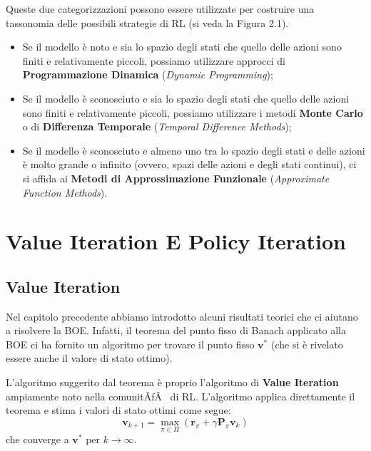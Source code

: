 ﻿\documentclass[11pt, a4paper]{report}
\begin{document}
Queste due categorizzazioni possono essere utilizzate per costruire una tassonomia delle possibili strategie di RL (si veda la Figura 2.1).
\begin{itemize}
    \item Se il modello è noto e sia lo spazio degli stati che quello delle azioni sono finiti e relativamente piccoli, possiamo utilizzare approcci di \textbf{Programmazione Dinamica} (\emph{Dynamic Programming});
\end{itemize}

\newpage

\begin{itemize}
    \item Se il modello è sconosciuto e sia lo spazio degli stati che quello delle azioni sono finiti e relativamente piccoli, possiamo utilizzare i metodi \textbf{Monte Carlo} o di \textbf{Differenza Temporale} (\emph{Temporal Difference Methods});
    \item Se il modello è sconosciuto e almeno uno tra lo spazio degli stati e delle azioni è molto grande o infinito (ovvero, spazi delle azioni e degli stati continui), ci si affida ai \textbf{Metodi di Approssimazione Funzionale} (\emph{Approximate Function Methods}).
\end{itemize}


\newpage

\section{Value Iteration E Policy Iteration}

\subsection{Value Iteration}

Nel capitolo precedente abbiamo introdotto alcuni risultati teorici che ci aiutano a risolvere la BOE. Infatti, il teorema del punto fisso di Banach applicato alla BOE ci ha fornito un algoritmo per trovare il punto fisso $\bm{v}^*$ (che si è rivelato essere anche il valore di stato ottimo).

L'algoritmo suggerito dal teorema è proprio l'algoritmo di \textbf{Value Iteration} ampiamente noto nella comunitÃƒÂ  di RL. L'algoritmo applica direttamente il teorema e stima i valori di stato ottimi come segue:
\begin{equation}
\bm{v}_{k+1} = \max_{\pi \in \Pi} (\bm{r}_\pi + \gamma \bm{P}_\pi \bm{v}_k)
\end{equation}
che converge a $\bm{v}^*$ per $k \to \infty$.
\end{document}
